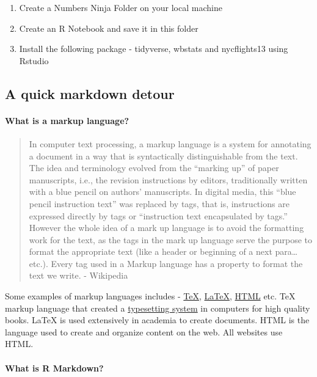 \documentclass[]{article}
\providecommand{\tightlist}{%
  \setlength{\itemsep}{0pt}\setlength{\parskip}{0pt}}
\let\oldparagraph\paragraph
\renewcommand{\paragraph}[1]{\oldparagraph{#1}\mbox{}}
\begin{document}
\begin{enumerate}
\def\labelenumi{\arabic{enumi}.}
\tightlist
\item
  Create a Numbers Ninja Folder on your local machine
\item
  Create an R Notebook and save it in this folder
\item
  Install the following package - tidyverse, wbstats and nycflights13
  using Rstudio
\end{enumerate}

\subsection{A quick markdown detour}\label{a-quick-markdown-detour}

\paragraph{What is a markup language?}\label{what-is-a-markup-language}

\begin{quote}
In computer text processing, a markup language is a system for
annotating a document in a way that is syntactically distinguishable
from the text. The idea and terminology evolved from the ``marking up''
of paper manuscripts, i.e., the revision instructions by editors,
traditionally written with a blue pencil on authors' manuscripts. In
digital media, this ``blue pencil instruction text'' was replaced by
tags, that is, instructions are expressed directly by tags or
``instruction text encapsulated by tags.'' However the whole idea of a
mark up language is to avoid the formatting work for the text, as the
tags in the mark up language serve the purpose to format the appropriate
text (like a header or beginning of a next para\ldots{}etc.). Every tag
used in a Markup language has a property to format the text we write. -
Wikipedia
\end{quote}

Some examples of markup languages includes -
\href{https://en.wikipedia.org/wiki/TeX}{TeX},
\href{https://en.wikipedia.org/wiki/LaTeX}{LaTeX},
\href{https://en.wikipedia.org/wiki/HTML}{HTML} etc. TeX markup language
that created a
\href{https://en.wikipedia.org/wiki/Typesetting}{typesetting system} in
computers for high quality books. LaTeX is used extensively in academia
to create documents. HTML is the language used to create and organize
content on the web. All websites use HTML.

\paragraph{What is R Markdown?}\label{what-is-r-markdown}
\end{document}
